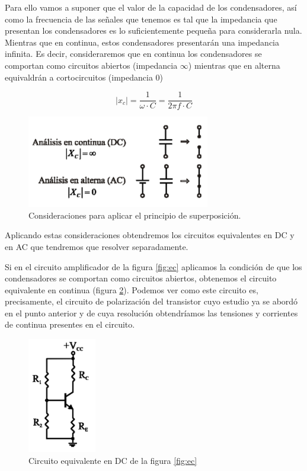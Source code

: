 Para ello vamos a suponer que el valor de la capacidad de los condensadores, así como la frecuencia de las señales que tenemos es tal que la impedancia que presentan
los condensadores es lo suficientemente pequeña para considerarla nula. Mientras que en continua, estos condensadores presentarán una impedancia infinita. Es decir, consideraremos que en continua los condensadores se comportan como circuitos abiertos (impedancia $\infty$) mientras que en alterna equivaldrán a cortocircuitos (impedancia $0$)

\begin{equation}
    |x_c|=\dfrac{1}{\omega \cdot C}=\dfrac{1}{2\pi f \cdot C}
    \label{eqn:capacitores}
\end{equation}

\begin{figure}[H]
    \centering
    \includegraphics[width=8cm]{Imagenes/analisis_condensadores.png}
    \caption{Consideraciones para aplicar el principio de superposición.}
    \label{fig:consideraciones}
\end{figure}

Aplicando estas consideraciones obtendremos los circuitos equivalentes en DC y en AC que tendremos que resolver separadamente.

Si en el circuito amplificador de la figura \ref{fig:ec} aplicamos la condición de que los condensadores se comportan como circuitos abiertos, obtenemos el circuito equivalente en continua (figura \ref{fig:universal}). Podemos ver como este circuito es, precisamente, el circuito de polarización del transistor cuyo estudio ya se abordó en el punto anterior y de cuya
resolución obtendríamos las tensiones y corrientes de continua presentes en el circuito.

\begin{figure}[H]
    \centering
    \includegraphics[width=3cm]{Imagenes/universal.png}
    \caption{Circuito equivalente en DC de la figura \ref{fig:ec}}
    \label{fig:universal}
\end{figure}

